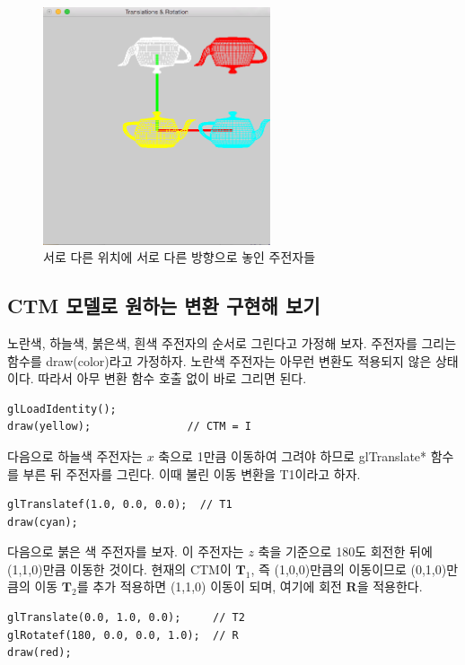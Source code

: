 \begin{figure}[h!]
  \centering
    \includegraphics[height=7cm]{OGL_transform/fourTeapots.png}
    \caption{서로 다른 위치에 서로 다른 방향으로 놓인 주전자들}
    \label{fig:OGL_transform:fourTeapots}
\end{figure}


\subsection{CTM 모델로 원하는 변환 구현해 보기}

노란색, 하늘색, 붉은색, 흰색 주전자의 순서로 그린다고 가정해 보자. 주전자를 그리는 함수를 {\sf draw(color)}라고 가정하자.
노란색 주전자는 아무런 변환도 적용되지 않은 상태이다. 따라서 아무 변환 함수 호출 없이 바로 그리면 된다.

\begin{verbatim}
glLoadIdentity();
draw(yellow);				// CTM = I 
\end{verbatim}

다음으로 하늘색 주전자는 $x$ 축으로 1만큼 이동하여 그려야 하므로 {\sf glTranslate*} 함수를 부른 뒤 주전자를 그린다. 이때 불린 이동 변환을 T1이라고 하자.

\begin{verbatim}
glTranslatef(1.0, 0.0, 0.0);  // T1
draw(cyan);
\end{verbatim}

다음으로 붉은 색 주전자를 보자. 이 주전자는 $z$ 축을 기준으로 180도 회전한 뒤에 (1,1,0)만큼 이동한 것이다. 현재의 CTM이 ${\mathbf T}_1$, 
즉 (1,0,0)만큼의 이동이므로 (0,1,0)만큼의 이동 ${\mathbf T}_2$를 추가 적용하면 (1,1,0) 이동이 되며, 여기에 회전 ${\mathbf R}$을 적용한다.

\begin{verbatim}
glTranslate(0.0, 1.0, 0.0);		// T2
glRotatef(180, 0.0, 0.0, 1.0);	// R
draw(red);
\end{verbatim}

